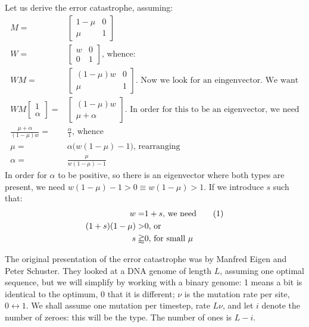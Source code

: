 \documentclass[]{article}
\newcommand\numberthis{\addtocounter{equation}{1}\tag{\theequation}}
\begin{document}
Let us derive the error catastrophe, assuming:
\begin{align*}
	M =& \begin{bmatrix}
		1-\mu&0\\
		\mu&1
	\end{bmatrix}\\
	W=& \begin{bmatrix}
		w&0\\
		0&1
	\end{bmatrix} \text{, whence:}\\
	WM =& \begin{bmatrix}
		(1-\mu)w&0\\
		\mu&1
	\end{bmatrix} \text{. Now we look for an eingenvector. We want}\\
	WM\begin{bmatrix}
		1\\
		\alpha
	\end{bmatrix}=&\begin{bmatrix}
				(1-\mu)w\\
				\mu+\alpha
			\end{bmatrix} \text{. In order for this to be an eigenvector, we need}\\
	\frac{\mu+\alpha}{(1-\mu)w} =& \frac{\alpha}{1} \text{, whence}\\
	\mu =& \alpha \big(w(1-\mu)-1\big) \text{, rearranging}\\
	\alpha =& \frac{\mu}{w(1-\mu)-1}
\end{align*}
In order for $\alpha$ to be positive, so there is an eigenvector where both types are present, we need $w(1-\mu)-1>0 \equiv w(1-\mu)>1$. If we introduce $s$ such that:
\begin{align*}
	w =& 1+s \text{, we need} \numberthis \label{eq:s:w}\\
	(1+s)(1-\mu) >& 0 \text{, or}\\
	s \gtrapprox& 0 \text{, for small $\mu$}
\end{align*}


The original presentation of the error catastrophe was by Manfred Eigen and Peter Schuster. They looked at a DNA genome of length $L$, assuming one optimal sequence, but we will simplify by working with a binary genome: 1 means a bit is identical to the optimum, 0 that it is different; $\nu$ is the mutation rate per site, $0\leftrightarrow1$. We shall assume one mutation per timestep, rate $L\nu$, and let $i$ denote the number of zeroes: this will be the type. The number of ones is $L-i$.
\end{document}
